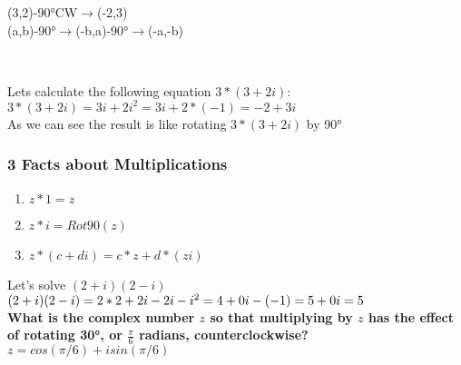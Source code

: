 \documentclass[a4paper,12pt,openany,oneside]{article}
\begin{document}
\begin{minipage}{200pt}
(3,2)-90°CW$\rightarrow$(-2,3)\\
(a,b)-90°$\rightarrow$(-b,a)-90°$\rightarrow$(-a,-b)
\end{minipage}\\
\hspace{30pt}
\begin{center}
\end{center}
\newpage
Lets calculate the following equation $3*(3+2i)$:\\
$3*(3+2i) = 3i+2i^2 = 3i+2*(-1) = -2+3i$\\
As we can see the result is like rotating $3*(3+2i)$ by 90°\\
\subsubsection{3 Facts about Multiplications}
\begin{enumerate}
    \item $z*1=z$
    \item $z*i=Rot90(z)$
    \item $z*(c+di)=c*z+d*(zi)$
\end{enumerate}
Let's solve $(2+i)(2-i)$\\
$(2+i)(2-i) =\\ 2*2+2i-2i-i^2 = \\4+0i-(-1) =\\ 5+0i = 5$
\vspace{10pt}
\\
\textbf{What is the complex number $z$ so that multiplying by $z$ has the effect of rotating 30°, or $\frac{\pi}{6}$ radians, counterclockwise?\\}
$z=cos(\pi/6)+isin(\pi/6)$\\[0.5cm]
\end{document}
